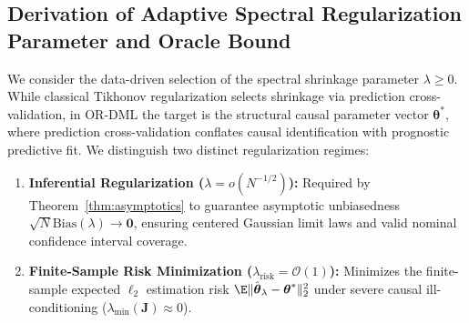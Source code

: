 \subsection{Derivation of Adaptive Spectral Regularization Parameter and Oracle Bound}
\label{app:adaptive_lambda_derivation}
We consider the data-driven selection of the spectral shrinkage parameter $\lambda \ge 0$. While classical Tikhonov regularization selects shrinkage via prediction cross-validation, in OR-DML the target is the structural causal parameter vector $\boldsymbol{\theta}^*$, where prediction cross-validation conflates causal identification with prognostic predictive fit.
We distinguish two distinct regularization regimes:
\begin{enumerate}
    \item \textbf{Inferential Regularization ($\lambda = o(N^{-1/2})$):} Required by Theorem~\ref{thm:asymptotics} to guarantee asymptotic unbiasedness $\sqrt{N}\mathrm{Bias}(\lambda) \to \mathbf{0}$, ensuring centered Gaussian limit laws and valid nominal confidence interval coverage.
    \item \textbf{Finite-Sample Risk Minimization ($\lambda_{\mathrm{risk}} = \mathcal{O}(1)$):} Minimizes the finite-sample expected $\ell_2$ estimation risk $\E\|\hat{\boldsymbol{\theta}}_\lambda - \boldsymbol{\theta}^*\|_2^2$ under severe causal ill-conditioning ($\lambda_{\min}(\boldsymbol{J}) \approx 0$).
\end{enumerate}

